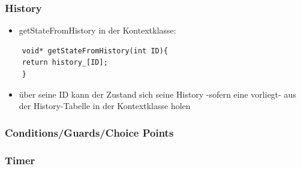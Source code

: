 \documentclass{beamer}
\begin{document}
\begin{frame}[fragile]
	\frametitle{History}
	\begin{itemize}
		\item getStateFromHistory in der Kontextklasse:
	\end{itemize}
	\begin{lstlisting}
	void* getStateFromHistory(int ID){
	return history_[ID];
	}
	\end{lstlisting}
	\begin{itemize}
		\item \"uber seine ID kann der Zustand sich seine History -sofern eine vorliegt- aus der History-Tabelle in der Kontextklasse holen
	\end{itemize}
\end{frame}

\begin{frame}
 \frametitle{Conditions/Guards/Choice Points}
\end{frame}

\begin{frame}
 \frametitle{Timer}
\end{frame}
\end{document}
